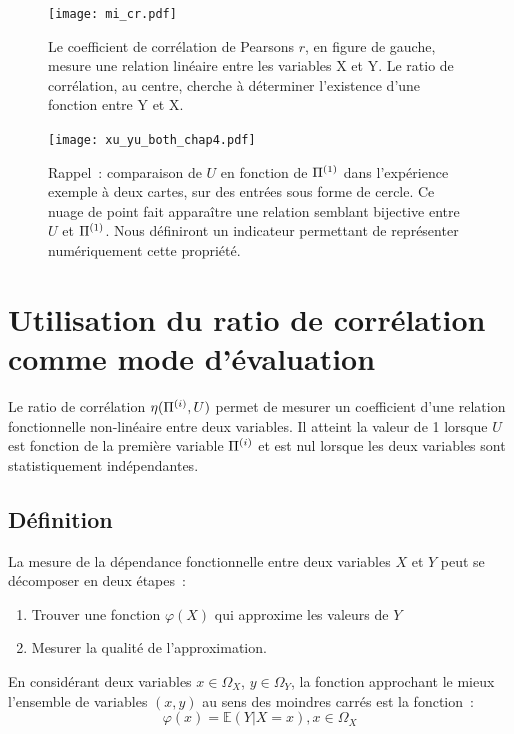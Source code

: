 \documentclass[../main]{subfiles}
\begin{document}
\begin{figure}
    \texttt{[image: mi\_cr.pdf]}
    \caption{Le coefficient de corrélation de Pearsons $r$, en figure de gauche, mesure une relation linéaire entre les variables X et Y. Le ratio de corrélation, au centre, cherche à déterminer l'existence d'une fonction entre Y et X. \label{fig:signaux}}
\end{figure}

\begin{figure}
    \centering
    \texttt{[image: xu\_yu\_both\_chap4.pdf]}
    \caption{Rappel~: comparaison de $U$ en fonction de $\Pi^{({1})}$ dans l'expérience exemple à deux cartes, sur des entrées sous forme de cercle. Ce nuage de point fait apparaître une relation semblant bijective entre $U$ et $\Pi^{({1})}$. Nous définiront un indicateur permettant de représenter numériquement cette propriété.
    \label{fig:upi_chap4}}
\end{figure}

\section{Utilisation du ratio de corrélation comme mode d'évaluation}

Le ratio de corrélation $\eta(\Pi^{({i})},U)$ permet de mesurer un coefficient d'une relation fonctionnelle non-linéaire entre deux variables. Il atteint la valeur de 1 lorsque $U$ est fonction de la première variable $\Pi^{({i})}$ et est nul lorsque les deux variables sont statistiquement indépendantes.

\subsection{Définition}

La mesure de la dépendance fonctionnelle entre deux variables $X$ et $Y$ peut se décomposer en deux étapes~:
\begin{enumerate}
    \item Trouver une fonction $\varphi(X)$ qui approxime les valeurs de $Y$
    \item Mesurer la qualité de l'approximation.
\end{enumerate}

En considérant deux variables $x \in \Omega_X$, $y \in \Omega_Y$, la fonction approchant le mieux l'ensemble de variables $(x,y)$ au sens des moindres carrés est la fonction~:
\begin{equation}
    \varphi(x) = \mathbb{E}(Y|X = x), x \in \Omega_X
\end{equation}
\end{document}
